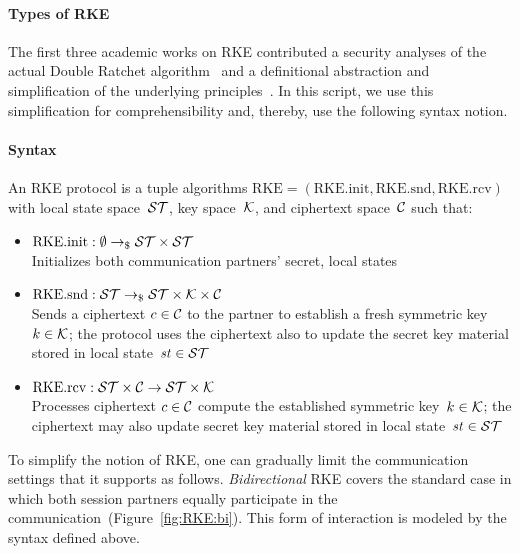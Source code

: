 \paragraph{Types of RKE}
The first three academic works on RKE contributed a security analyses of the actual Double Ratchet algorithm~\cite{JC:CCDGS20} and a definitional abstraction and simplification of the underlying principles~\cite{C:BSJNS17,C:PoeRos18}.
In this script, we use this simplification for comprehensibility and, thereby, use the following syntax notion.

\newcommand{\RKE}{\mathrm{RKE}}%
\newcommand{\RKEinit}{\RKE.\mathrm{init}}%
\newcommand{\RKEsnd}{\RKE.\mathrm{snd}}%
\newcommand{\RKErcv}{\RKE.\mathrm{rcv}}%


\paragraph{Syntax} An RKE protocol is a tuple algorithms $\RKE=(\RKEinit, \RKEsnd, \RKErcv)$ with local state space~$\mathcal{ST}$, key space~$\mathcal{K}$, and ciphertext space~$\mathcal{C}$ such that:
\begin{itemize}
    \item $\RKEinit: \emptyset\tor\stsp\times\stsp$\\
    Initializes both communication partners' secret, local states
    \item $\RKEsnd: \stsp\tor\stsp\times\ksp\times\csp$\\
    Sends a ciphertext $c\in\mathcal{C}$ to the partner to establish a fresh symmetric key~$k\in\mathcal{K}$;
    the protocol uses the ciphertext also to update the secret key material stored in local state~$\mathit{st}\in\mathcal{ST}$
    \item $\RKErcv: \stsp\times\csp\to\stsp\times\ksp$\\
    Processes ciphertext $c\in\mathcal{C}$ compute the established symmetric key~$k\in\mathcal{K}$;
    the ciphertext may also update secret key material stored in local state~$\mathit{st}\in\mathcal{ST}$
\end{itemize}





To simplify the notion of RKE, one can gradually limit the communication settings that it supports as follows.
\emph{Bidirectional} RKE covers the standard case in which both session partners equally participate in the communication~(Figure~\ref{fig:RKE:bi}).
This form of interaction is modeled by the syntax defined above.

